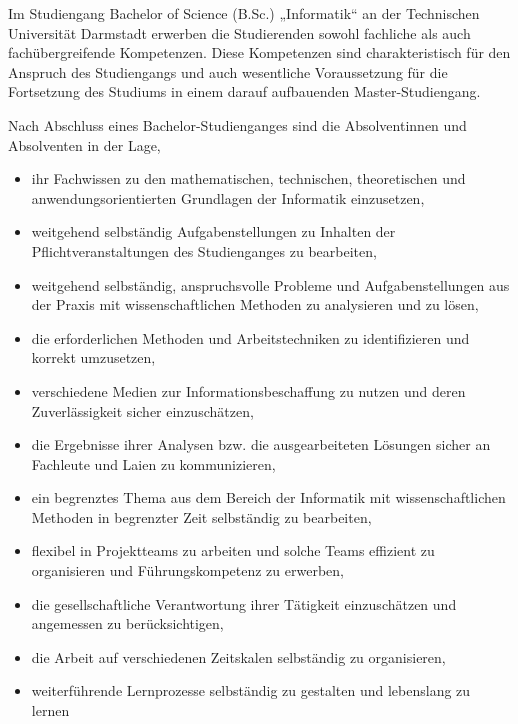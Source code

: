 {Im Studiengang Bachelor of Science (B.Sc.) „Informatik“ an der Technischen Universität Darmstadt erwerben die Studierenden sowohl fachliche als auch fachübergreifende Kompetenzen. Diese Kompetenzen sind charakteristisch für den Anspruch des Studiengangs und auch wesentliche Voraussetzung für die Fortsetzung des Studiums in einem darauf aufbauenden Master-Studiengang.

    Nach Abschluss eines Bachelor-Studienganges sind die Absolventinnen und Absolventen in der Lage,
    \begin{itemize}
        \item{ihr Fachwissen zu den mathematischen, technischen, theoretischen und anwendungsorientierten Grundlagen der Informatik einzusetzen,}
        \item{weitgehend selbständig Aufgabenstellungen zu Inhalten der Pflichtveranstaltungen des Studienganges zu bearbeiten,}
        \item{weitgehend selbständig, anspruchsvolle Probleme und Aufgabenstellungen aus der Praxis mit wissenschaftlichen Methoden zu analysieren und zu lösen,}
        \item{die erforderlichen Methoden und Arbeitstechniken zu identifizieren und korrekt umzusetzen,}
        \item{verschiedene Medien zur Informationsbeschaffung zu nutzen und deren Zuverlässigkeit sicher einzuschätzen,}
        \item{die Ergebnisse ihrer Analysen bzw. die ausgearbeiteten Lösungen sicher an Fachleute und Laien zu kommunizieren,}
        \item{ein begrenztes Thema aus dem Bereich der Informatik mit wissenschaftlichen Methoden in begrenzter Zeit selbständig zu bearbeiten,}
        \item{flexibel in Projektteams zu arbeiten und solche Teams effizient zu organisieren und Führungskompetenz zu erwerben,}
        \item{die gesellschaftliche Verantwortung ihrer Tätigkeit einzuschätzen und angemessen zu berücksichtigen,}
        \item{die Arbeit auf verschiedenen Zeitskalen selbständig zu organisieren,}
        \item{weiterführende Lernprozesse selbständig zu gestalten und lebenslang zu lernen}
    \end{itemize}
}{}

\newpage
